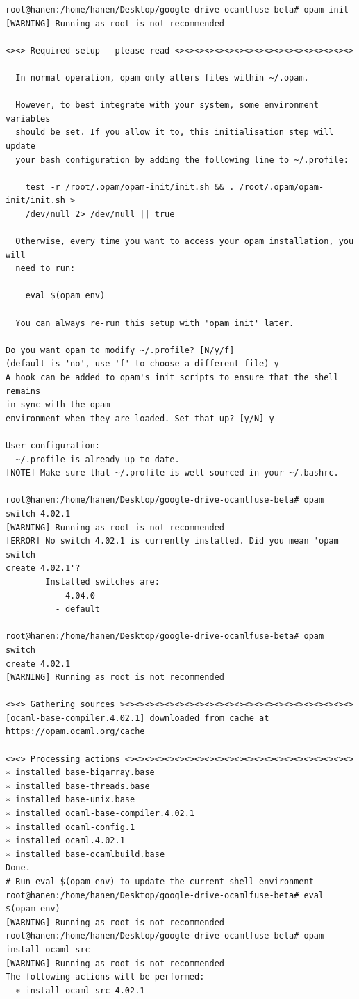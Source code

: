 \begin{verbatim}
root@hanen:/home/hanen/Desktop/google-drive-ocamlfuse-beta# opam init
[WARNING] Running as root is not recommended

<><> Required setup - please read <><><><><><><><><><><><><><><><><><>

  In normal operation, opam only alters files within ~/.opam.

  However, to best integrate with your system, some environment variables
  should be set. If you allow it to, this initialisation step will update
  your bash configuration by adding the following line to ~/.profile:

    test -r /root/.opam/opam-init/init.sh && . /root/.opam/opam-init/init.sh >
    /dev/null 2> /dev/null || true

  Otherwise, every time you want to access your opam installation, you will
  need to run:

    eval $(opam env)

  You can always re-run this setup with 'opam init' later.

Do you want opam to modify ~/.profile? [N/y/f]
(default is 'no', use 'f' to choose a different file) y
A hook can be added to opam's init scripts to ensure that the shell remains 
in sync with the opam
environment when they are loaded. Set that up? [y/N] y

User configuration:
  ~/.profile is already up-to-date.
[NOTE] Make sure that ~/.profile is well sourced in your ~/.bashrc.

root@hanen:/home/hanen/Desktop/google-drive-ocamlfuse-beta# opam switch 4.02.1
[WARNING] Running as root is not recommended
[ERROR] No switch 4.02.1 is currently installed. Did you mean 'opam switch 
create 4.02.1'?
        Installed switches are:
          - 4.04.0
          - default

root@hanen:/home/hanen/Desktop/google-drive-ocamlfuse-beta# opam switch 
create 4.02.1
[WARNING] Running as root is not recommended

<><> Gathering sources ><><><><><><><><><><><><><><><><><><><><><><><>
[ocaml-base-compiler.4.02.1] downloaded from cache at 
https://opam.ocaml.org/cache

<><> Processing actions <><><><><><><><><><><><><><><><><><><><><><><>
∗ installed base-bigarray.base
∗ installed base-threads.base
∗ installed base-unix.base
∗ installed ocaml-base-compiler.4.02.1
∗ installed ocaml-config.1
∗ installed ocaml.4.02.1
∗ installed base-ocamlbuild.base
Done.
# Run eval $(opam env) to update the current shell environment
root@hanen:/home/hanen/Desktop/google-drive-ocamlfuse-beta# eval 
$(opam env)
[WARNING] Running as root is not recommended
root@hanen:/home/hanen/Desktop/google-drive-ocamlfuse-beta# opam 
install ocaml-src
[WARNING] Running as root is not recommended
The following actions will be performed:
  ∗ install ocaml-src 4.02.1


\end{verbatim}
